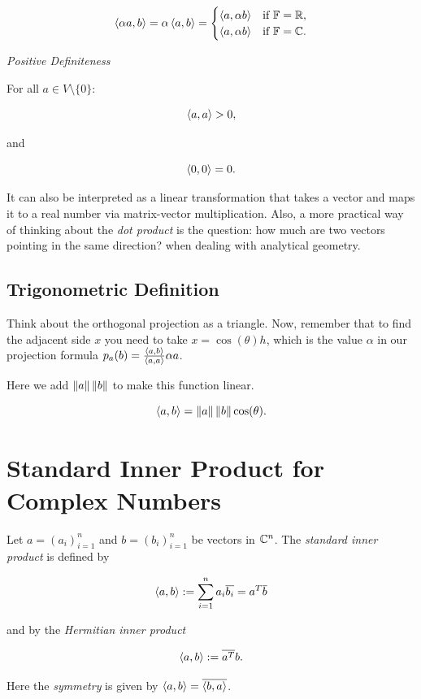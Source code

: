 \[
    \left\langle\alpha a, b\right\rangle = \alpha \left\langle a, b\right\rangle = 
    \begin{cases}
    \langle a, \alpha b \rangle & \text{if } \mathbb{F} = \mathbb{R}, \\
    \langle a, \alpha b \rangle & \text{if } \mathbb{F} = \mathbb{C}.
    \end{cases}
\]

\emph{Positive Definiteness}

For all \(a \in V \setminus \{0\}\):

\[
    \left\langle a, a\right\rangle > 0,
\]

and

\[
    \left\langle0, 0\right\rangle = 0.
\]

It can also be interpreted as a linear transformation that takes a vector and maps it to a real number via matrix-vector multiplication. Also, 
a more practical way of thinking about the \emph{dot product} is the question: how much are two vectors pointing in the same direction? when 
dealing with analytical geometry.

\subsection{Trigonometric Definition}

Think about the orthogonal projection as a triangle. Now, remember that to find the adjacent side \(x\) 
you need to take \(x = \cos(\theta)h\), which is the value \(\alpha\) in our projection formula 
\(p_a (b) = \frac{\left\langle a, b\right\rangle}{\left\langle a, a\right\rangle} \alpha a\). 

Here we add \(\left\| a \right\|\left\| b \right\|\) to make this function linear.

\[
    \left\langle a, b\right\rangle = \left\| a \right\| \left\| b \right\| \cos (\theta).
\]

\section{Standard Inner Product for Complex Numbers}

Let \( a = {(a_i)}_{i=1}^n \) and \( b = {(b_i)}_{i=1}^n \) be vectors in \( \mathbb{C}^n \). The \emph{standard 
inner product} is defined by

\[
    \left\langle a, b\right\rangle := \sum_{i=1}^n a_i \overline{b_i} = a^T \overline{b}
\]

and by the \emph{Hermitian inner product}

\[
   \left\langle a, b\right\rangle := \overline{a^{T}} b.
\]

Here the \emph{symmetry} is given by \(\left\langle a, b\right\rangle = \overline{\left\langle b, a\right\rangle}\).

